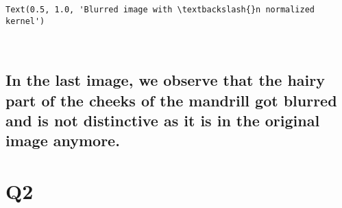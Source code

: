 \documentclass[11pt]{article}
\makeatletter
\newcommand{\boxspacing}{\kern\kvtcb@left@rule\kern\kvtcb@boxsep}
\newcommand{\prompt}[4]{
        {\ttfamily\llap{{\color{#2}[#3]:\hspace{3pt}#4}}\vspace{-\baselineskip}}
    }
\makeatother
\begin{document}
            \begin{tcolorbox}[breakable, size=fbox, boxrule=.5pt, pad at break*=1mm, opacityfill=0]
\prompt{Out}{outcolor}{14}{\boxspacing}
\begin{Verbatim}[commandchars=\\\{\}]
Text(0.5, 1.0, 'Blurred image with \textbackslash{}n normalized kernel')
\end{Verbatim}
\end{tcolorbox}
        
    \begin{center}
    \end{center}
    { \hspace*{\fill} \\}
    
    \hypertarget{in-the-last-image-we-observe-that-the-hairy-part-of-the-cheeks-of-the-mandrill-got-blurred-and-is-not-distinctive-as-it-is-in-the-original-image-anymore.}{%
\subsection{In the last image, we observe that the hairy part of the
cheeks of the mandrill got blurred and is not distinctive as it is in
the original image
anymore.}\label{in-the-last-image-we-observe-that-the-hairy-part-of-the-cheeks-of-the-mandrill-got-blurred-and-is-not-distinctive-as-it-is-in-the-original-image-anymore.}}

    \hypertarget{q2}{%
\section{Q2}\label{q2}}
\end{document}
